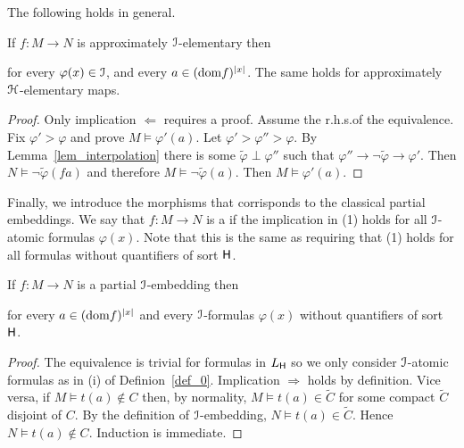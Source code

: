 \documentclass[10pt,oneside]{amsproc}
\renewcommand*{\emph}[1]{%
   \smash{\tikz[baseline]\node[rectangle, fill=teal!25, rounded corners, inner xsep=0.5ex, inner ysep=0.2ex, anchor=base, minimum height = 2.7ex]{\strut #1};}}
\begin{document}
The following holds in general.

\begin{fact}\label{fact_HImorphisms}
  If $f:M\to N$ is approximately ${\EuScript I}$-elementary then


  for every $\varphi(x)\in{\EuScript I}$, and every $a\in({\rm dom }f)^{|x|}$.
  The same holds for approximately ${\EuScript H}$-elementary maps.
\end{fact}

\begin{proof}
  Only implication $\Leftarrow$ requires a proof.
  Assume the r.h.s.\@ of the equivalence.
  Fix $\varphi'>\varphi$ and prove $M\models\varphi'(a)$.
  Let  $\varphi'>\varphi''>\varphi$.
  By Lemma~\ref{lem_interpolation} there is some $\tilde{\varphi}\perp\varphi''$ such that $\varphi''\rightarrow\neg\tilde{\varphi}\rightarrow\varphi'$.
  Then $N\models\neg\tilde{\varphi}(fa)$ and therefore  $M\models\neg\tilde{\varphi}(a)$.
  Then $M\models\varphi'(a)$.
\end{proof}

Finally, we introduce the morphisms that corrisponds to the classical partial embeddings.
We say that $f:M\to N$ is a \emph{partial ${\EuScript I}$-embedding\/} if the implication in (1) holds for all ${\EuScript I}$-atomic formulas $\varphi(x)$.
Note that this is the same as requiring that (1) holds for all formulas without quantifiers of sort ${\sf H}$.

\begin{fact}
  If $f:M\to N$ is a partial ${\EuScript I}$-embedding then 


  for every $a\in({\rm dom }f)^{|x|}$ and every ${\EuScript I}$-formulas $\varphi(x)$ without quantifiers of sort ${\sf H}$.
\end{fact}

\begin{proof}
  The equivalence is trivial for formulas in $L_{\sf H}$ so we only consider ${\EuScript I}$-atomic formulas as in (i) of Definion~\ref{def_0}.
  Implication $\Rightarrow$ holds by definition. 
  Vice versa, if $M\models t(a)\notin C$ then, by normality,  $M\models t(a)\in\tilde{C}$ for some compact $\tilde C$ disjoint of $C$.
  By the definition of ${\EuScript I}$-embedding, $N\models t(a)\in\tilde{C}$.
  Hence $N\models t(a)\notin C$.
  Induction is immediate.
\end{proof}
\end{document}
